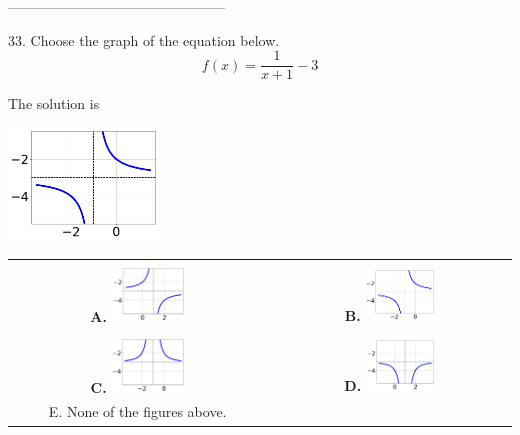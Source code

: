 \documentclass{extbook}[14pt]
\begin{document}
-----------------------------------------------

33. Choose the graph of the equation below.
\[ f(x) = \frac{1}{x + 1} - 3 \] 

 
 The solution is  
 \begin{center} \includegraphics[width=0.3\textwidth]{../Figures/rationalEquationToGraphBB.png} \end{center}\begin{tabular}{|c|c|} 
\hline 
 & \tabularnewline 
 \textbf{A.} \includegraphics[width=0.3\textwidth]{../Figures/rationalEquationToGraphAB.png} & \textbf{B.} \includegraphics[width=0.3\textwidth]{../Figures/rationalEquationToGraphBB.png} \tabularnewline 
\hline 
 & \tabularnewline 
 \textbf{C.} \includegraphics[width=0.3\textwidth]{../Figures/rationalEquationToGraphCB.png} & \textbf{D.} \includegraphics[width=0.3\textwidth]{../Figures/rationalEquationToGraphDB.png} \tabularnewline 
\hline 
 E. None of the figures above. & \tabularnewline 
\hline 
 \end{tabular} 
 
\end{document}
